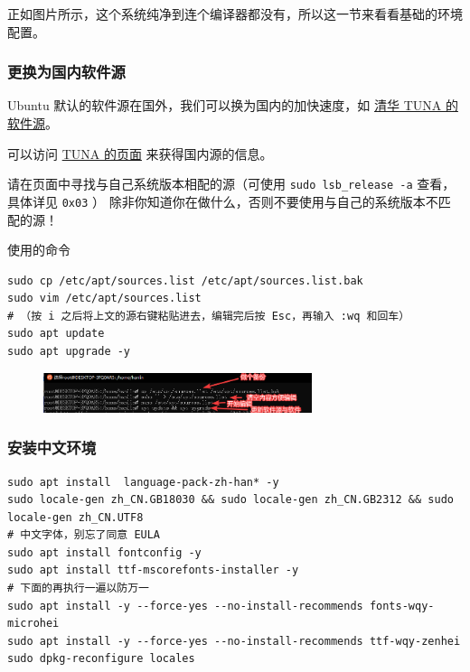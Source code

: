  正如图片所示，这个系统纯净到连个编译器都没有，所以这一节来看看基础的环境配置。

\subsubsection{更换为国内软件源}

Ubuntu 默认的软件源在国外，我们可以换为国内的加快速度，如 \href{https://mirrors.tuna.tsinghua.edu.cn/help/ubuntu/}{清华 TUNA 的软件源}。  

可以访问 \href{https://mirrors.tuna.tsinghua.edu.cn/help/ubuntu/}{TUNA 的页面} 来获得国内源的信息。

\begin{WARNING}{}{}
 请在页面中寻找与自己系统版本相配的源（可使用 \texttt{sudo lsb\_release -a} 查看，具体详见 \texttt{0x03} ）  
 除非你知道你在做什么，否则不要使用与自己的系统版本不匹配的源！     

\end{WARNING}


使用的命令

\begin{verbatim}
sudo cp /etc/apt/sources.list /etc/apt/sources.list.bak
sudo vim /etc/apt/sources.list
# （按 i 之后将上文的源右键粘贴进去，编辑完后按 Esc，再输入 :wq 和回车）
sudo apt update
sudo apt upgrade -y
\end{verbatim}

\begin{figure}[htbp]
\centering
\includegraphics[width=0.7\textwidth]{docs/intro/images/WSL9.png} 

\end{figure}

\subsubsection{安装中文环境}

\begin{verbatim}
sudo apt install  language-pack-zh-han* -y
sudo locale-gen zh_CN.GB18030 && sudo locale-gen zh_CN.GB2312 && sudo locale-gen zh_CN.UTF8
# 中文字体，别忘了同意 EULA
sudo apt install fontconfig -y
sudo apt install ttf-mscorefonts-installer -y
# 下面的再执行一遍以防万一
sudo apt install -y --force-yes --no-install-recommends fonts-wqy-microhei
sudo apt install -y --force-yes --no-install-recommends ttf-wqy-zenhei
sudo dpkg-reconfigure locales
\end{verbatim}

